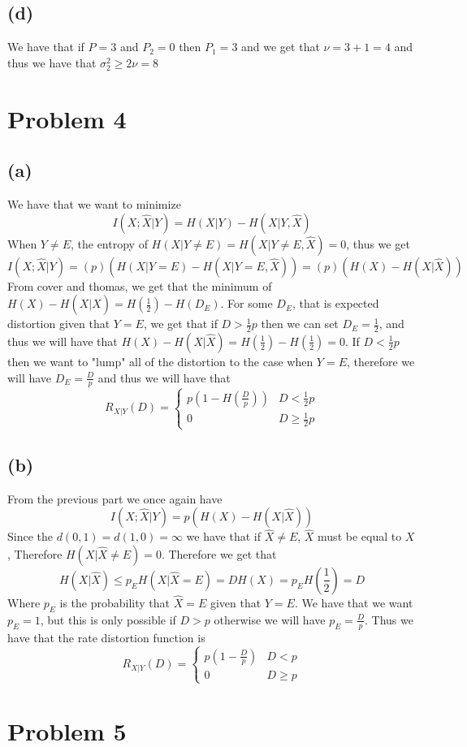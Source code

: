 \subsection*{(d)}
We have that if $P=3$ and $P_2=0$ then $P_1=3$ and we get that $\nu=3+1=4$ and thus we have that 
$\sigma_2^2\geq 2\nu=\boxed{8}$
\section*{Problem 4}
\subsection*{(a)}
We have that we want to minimize
$$I(X;\hat{X}|Y)=H(X|Y)-H(X|Y,\hat{X})$$
When $Y\neq E$, the entropy of $H(X|Y\neq E)=H(X|Y\neq E,\hat{X})=0$,
thus we get
$$I(X;\hat{X}|Y)=(p)(H(X|Y=E)-H(X|Y=E,\hat{X}))=(p)(H(X)-H(X|\hat{X}))
$$
From cover and thomas, we get that the minimum of $H(X)-H(X|\hat{X})=H(\frac{1}{2})-H(D_E)$.
For some $D_E$, that is expected distortion given that $Y=E$, we get that
if $D>\frac{1}{2}p$ then we can set $D_E=\frac{1}{2}$, and thus 
we will have that $H(X)-H(X|\hat{X})=H(\frac{1}{2})-H(\frac{1}{2})=0$.
If $D<\frac{1}{2}p$ then we want to "lump" all of the 
distortion to the case when $Y=E$, therefore we will have
$D_E=\frac{D}{p}$ and thus we will have that
$$R_{X|Y}(D)=\boxed{\begin{cases}
    p\left(1-H\left(\frac{D}{p}\right)\right) & D<\frac{1}{2}p\\
    0 & D\geq \frac{1}{2}p
\end{cases}}$$
\subsection*{(b)}
From the previous part we once again have 
$$I(X;\hat{X}|Y)=p(H(X)-H(X|\hat{X}))$$
Since the $d(0,1)=d(1,0)=\infty$ we have that 
if $\hat{X}\neq E$,  $\hat{X}$ must be equal to $X$, 
Therefore $H(X|\hat{X}\neq E)=0$. Therefore we get that 
$$H(X|\hat{X})\leq p_EH(X|\hat{X}=E)=DH(X)=p_EH(\frac{1}{2})=D$$
Where $p_E$ is the probability that $\hat{X}=E$ given that 
$Y=E$. We have that we want $p_E=1$, but this is only possible
if $D>p$ otherwise we will have $p_E=\frac{D}{p}$.
Thus we have that the rate distortion function is 
$$R_{X|Y}(D)=\boxed{\begin{cases}
    p(1-\frac{D}{p}) & D<p\\
    0 & D\geq p
\end{cases}}$$

\section*{Problem 5}
